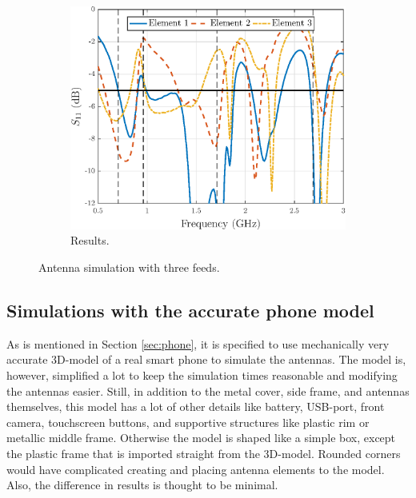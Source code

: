 \begin{figure}[H]
    \centering
    \ContinuedFloat 
    \begin{subfigure}[b]{0.49\textwidth}
        \includegraphics[width=\textwidth]{img/concept_3feeds.eps}
        \caption{Results.}
        \label{fig:concept_3feeds_res}
    \end{subfigure}
    \caption{Antenna simulation with three feeds.}
    \label{fig:concept_3feeds}
\end{figure}



\subsection{Simulations with the accurate phone model}
\label{sec:sim_realistic}
As is mentioned in Section \ref{sec:phone}, it is specified to use mechanically very accurate 3D-model of a real smart phone to simulate the antennas. The model is, however, simplified a lot to keep the simulation times reasonable and modifying the antennas easier. Still, in addition to the metal cover, side frame, and antennas themselves, this model has a lot of other details like battery, USB-port, front camera, touchscreen buttons, and supportive structures like plastic rim or metallic middle frame. Otherwise the model is shaped like a simple box, except the plastic frame that is imported straight from the 3D-model. Rounded corners would have complicated creating and placing antenna elements to the model. Also, the difference in results is thought to be minimal. 

